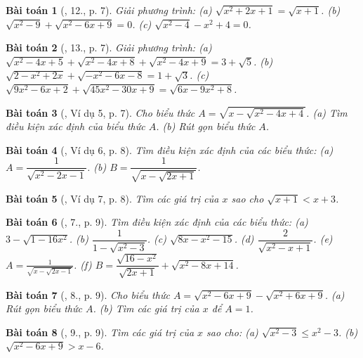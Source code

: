 \documentclass{article}
\newtheorem{baitoan}{Bài toán}
\begin{document}
\begin{baitoan}[\cite{Tuyen_Toan_9}, 12., p. 7]
	Giải phương trình: (a) $\sqrt{x^2 + 2x + 1} = \sqrt{x + 1}$. (b) $\sqrt{x^2 - 9} + \sqrt{x^2 - 6x + 9} = 0$. (c) $\sqrt{x^2 - 4} - x^2 + 4 = 0$.
\end{baitoan}

\begin{baitoan}[\cite{Tuyen_Toan_9}, 13., p. 7]
	Giải phương trình: (a) $\sqrt{x^2 - 4x + 5} + \sqrt{x^2 - 4x + 8} + \sqrt{x^2 - 4x + 9} = 3 + \sqrt{5}$. (b) $\sqrt{2 - x^2 + 2x} + \sqrt{-x^2 - 6x - 8} = 1 + \sqrt{3}$. (c) $\sqrt{9x^2 - 6x + 2} + \sqrt{45x^2 - 30x + 9} = \sqrt{6x - 9x^2 + 8}$. 
\end{baitoan}

\begin{baitoan}[\cite{Binh_Toan_9_tap_1}, Ví dụ 5, p. 7]
	Cho biểu thức $A = \sqrt{x - \sqrt{x^2 - 4x + 4}}$. (a) Tìm điều kiện xác định của biểu thức $A$. (b) Rút gọn biểu thức $A$.
\end{baitoan}

\begin{baitoan}[\cite{Binh_Toan_9_tap_1}, Ví dụ 6, p. 8]
	Tìm điều kiện xác định của các biểu thức: (a) $A = \dfrac{1}{\sqrt{x^2 - 2x - 1}}$. (b) $B = \dfrac{1}{\sqrt{x - \sqrt{2x + 1}}}$.
\end{baitoan}

\begin{baitoan}[\cite{Binh_Toan_9_tap_1}, Ví dụ 7, p. 8]
	Tìm các giá trị của $x$ sao cho $\sqrt{x + 1} < x + 3$.
\end{baitoan}

\begin{baitoan}[\cite{Binh_Toan_9_tap_1}, 7., p. 9]
	Tìm điều kiện xác định của các biểu thức: (a) $3 - \sqrt{1 - 16x^2}$. (b) $\dfrac{1}{1 - \sqrt{x^2 - 3}}$. (c) $\sqrt{8x - x^2 - 15}$. (d) $\dfrac{2}{\sqrt{x^2 - x + 1}}$. (e) $A = \frac{1}{\sqrt{x - \sqrt{2x - 1}}}$. (f) $B = \dfrac{\sqrt{16 - x^2}}{\sqrt{2x + 1}} + \sqrt{x^2 - 8x + 14}$.
\end{baitoan}

\begin{baitoan}[\cite{Binh_Toan_9_tap_1}, 8., p. 9]
	Cho biểu thức $A = \sqrt{x^2 - 6x + 9} - \sqrt{x^2 + 6x + 9}$. (a) Rút gọn biểu thức $A$. (b) Tìm các giá trị của $x$ để $A = 1$.
\end{baitoan}

\begin{baitoan}[\cite{Binh_Toan_9_tap_1}, 9., p. 9]
	Tìm các giá trị của $x$ sao cho: (a) $\sqrt{x^2 - 3}\le x^2 - 3$. (b) $\sqrt{x^2 - 6x + 9} > x - 6$.
\end{baitoan}
\end{document}

